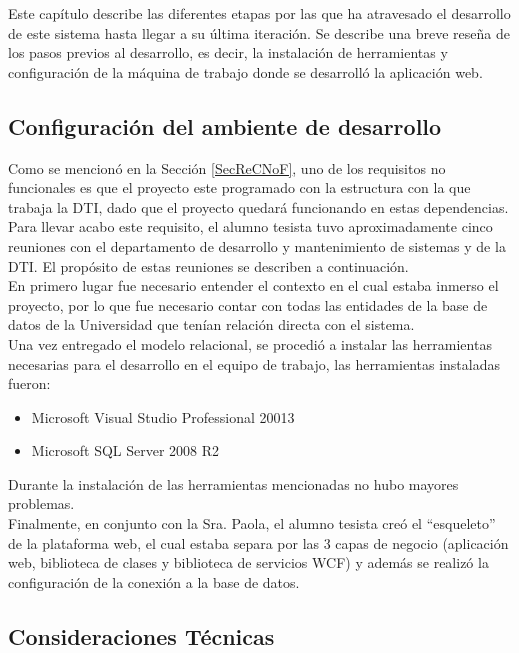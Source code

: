 Este capítulo describe las diferentes etapas por las que ha atravesado el desarrollo de
este sistema hasta llegar a su última iteración. Se describe una breve reseña de los pasos
previos al desarrollo, es decir, la instalación de herramientas y configuración de la máquina
de trabajo donde se desarrolló la aplicación web. 

\subsection{Configuración del ambiente de desarrollo}

Como se mencionó en la Sección \ref{SecReCNoF}, uno de los requisitos no funcionales es que el proyecto este programado con la estructura con la que trabaja la DTI, dado que el proyecto quedará funcionando en estas dependencias. Para llevar acabo este requisito, el alumno tesista tuvo aproximadamente cinco reuniones con el departamento de desarrollo y mantenimiento de sistemas y de la  DTI. El propósito de estas reuniones se describen a continuación.
\\

En primero lugar fue necesario entender el contexto en el cual estaba inmerso el proyecto, por lo que fue necesario contar con todas las entidades de la base de datos de la Universidad que tenían relación directa con el sistema.
\\

Una vez entregado el modelo relacional, se procedió a instalar las herramientas necesarias para el desarrollo en el equipo de trabajo, las herramientas instaladas fueron:
\begin{itemize}
	\item Microsoft Visual Studio Professional 20013
	\item Microsoft SQL Server 2008 R2
\end{itemize}

Durante la instalación de las herramientas mencionadas no hubo mayores problemas.
\\

Finalmente, en conjunto con la Sra. Paola, el alumno tesista creó el ``esqueleto'' de la plataforma web, el cual estaba separa por las 3 capas de negocio (aplicación web, biblioteca de clases y biblioteca de servicios WCF) y además se realizó la configuración de la conexión a la base de datos.



\subsection{Consideraciones Técnicas}

